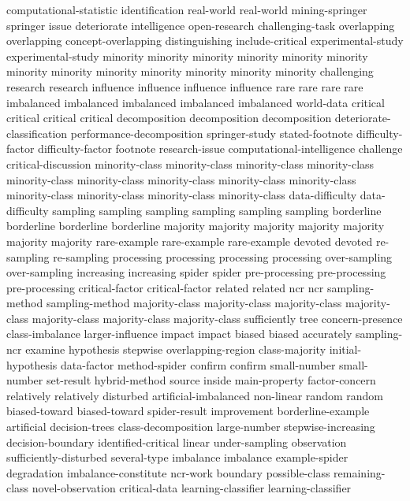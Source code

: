 computational-statistic	
identification	
real-world	real-world	
mining-springer	
springer	
issue	
deteriorate	
intelligence	
open-research	
challenging-task	
overlapping	overlapping	
concept-overlapping	
distinguishing	
include-critical	
experimental-study	experimental-study	
minority	minority	minority	minority	minority	minority	minority	minority	minority	minority	minority	minority	minority	
challenging	
research	research	
influence	influence	influence	influence	
rare	rare	rare	rare	
imbalanced	imbalanced	imbalanced	imbalanced	imbalanced	
world-data	
critical	critical	critical	critical	
decomposition	decomposition	decomposition	
deteriorate-classification	
performance-decomposition	
springer-study	
stated-footnote	
difficulty-factor	difficulty-factor	
footnote	
research-issue	
computational-intelligence	
challenge	
critical-discussion	
minority-class	minority-class	minority-class	minority-class	minority-class	minority-class	minority-class	minority-class	minority-class	minority-class	minority-class	minority-class	minority-class	
data-difficulty	data-difficulty	
sampling	sampling	sampling	sampling	sampling	sampling	
borderline	borderline	borderline	borderline	
majority	majority	majority	majority	majority	majority	majority	
rare-example	rare-example	rare-example	
devoted	devoted	
re-sampling	re-sampling	
processing	processing	processing	processing	
over-sampling	over-sampling	
increasing	increasing	
spider	spider	
pre-processing	pre-processing	pre-processing	
critical-factor	critical-factor	
related	related	
ncr	ncr	
sampling-method	sampling-method	
majority-class	majority-class	majority-class	majority-class	majority-class	majority-class	majority-class	
sufficiently	
tree	
concern-presence	
class-imbalance	
larger-influence	
impact	impact	
biased	biased	
accurately	
sampling-ncr	
examine	
hypothesis	
stepwise	
overlapping-region	
class-majority	
initial-hypothesis	
data-factor	
method-spider	
confirm	confirm	
small-number	small-number	
set-result	
hybrid-method	
source	
inside	
main-property	
factor-concern	
relatively	relatively	
disturbed	
artificial-imbalanced	
non-linear	
random	random	
biased-toward	biased-toward	
spider-result	
improvement	
borderline-example	
artificial	
decision-trees	
class-decomposition	
large-number	
stepwise-increasing	
decision-boundary	
identified-critical	
linear	
under-sampling	
observation	
sufficiently-disturbed	
several-type	
imbalance	imbalance	
example-spider	
degradation	
imbalance-constitute	
ncr-work	
boundary	
possible-class	
remaining-class	
novel-observation	
critical-data	
learning-classifier	learning-classifier	
